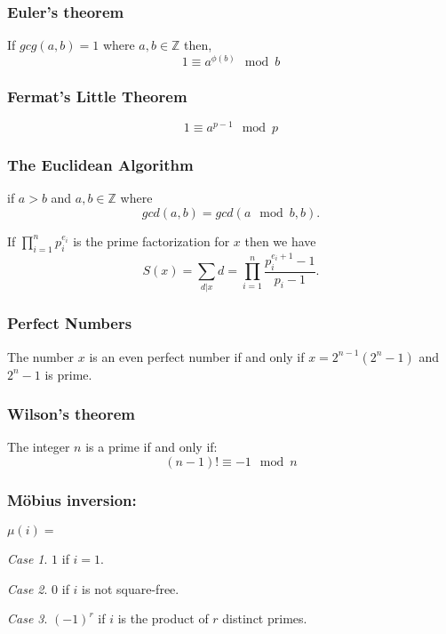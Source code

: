 \documentclass[10pt,a4paper,titlepage,twoside,draft]{article}
\theoremstyle{plain}
\theoremstyle{definition}
\theoremstyle{remark}
\newtheorem{case}{Case}
\begin{document}
\smallskip

\subsubsection{Euler's theorem}

If $gcg(a,b)=1$ where $a,b \in \mathbb{Z}$ then,
\[ 1 \equiv a^{\phi(b)} \mod{b} \]

\medskip

\subsubsection{Fermat's Little Theorem}
\[1 \equiv a^{p-1} \mod{p} \]

\medskip

\subsubsection{The Euclidean Algorithm}
if $a > b$ and $a,b \in \mathbb{Z}$ where 
\[gcd(a, b) = gcd(a \mod{b}, b).\]


If $\prod_{i=1}^n p^{e_{i}}_i$ is the prime factorization for $x$ then we have
\[S(x) = \sum_{d\vert x} d = \prod_{i=1}^{n} \frac{p^{e_{i}+1}_{i} - 1}{p_{i} - 1}.\]

\subsubsection{Perfect Numbers}
The number $x$ is an even perfect number if and only if $x = 2^{n-1}(2^{n} - 1)$ and $2^{n} - 1$ is prime.


\subsubsection{Wilson's theorem}
The integer $n$ is a prime if and only if:
\[(n-1)! \equiv -1 \mod{n}\]

\pagebreak

\subsubsection{M\"obius inversion:}

$\mu(i) = $
\begin{case}
$1$ if $i = 1$.
\end{case}
\smallskip
\begin{case}
$0$ if $i$ is not square-free.
\end{case}
\smallskip
\begin{case}
$(-1)^{r}$ if $i$ is the product of $r$ distinct primes.
\end{case}
\end{document}
